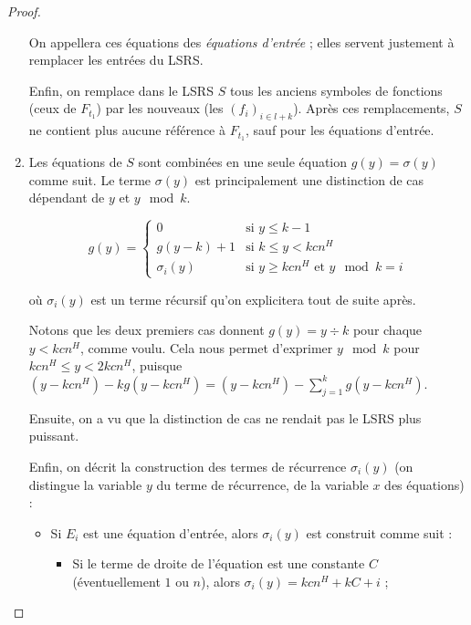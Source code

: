 \documentclass{article}
\begin{document}
\begin{proof}
\begin{enumerate}[itemsep=-1mm,leftmargin=2cm]
					On appellera ces équations des \emph{équations d'entrée} ; elles servent justement à remplacer les entrées du LSRS.
					
					Enfin, on remplace dans le LSRS $S$ tous les anciens symboles de fonctions (ceux de $F_{t_1}$) par les nouveaux (les $(f_i)_{i \in l+k}$). Après ces remplacements, $S$ ne contient plus aucune référence à $F_{t_1}$, sauf pour les équations d'entrée. 
					
				\item 	
					Les équations de $S$ sont combinées en une seule équation $g(y) = \sigma(y)$ comme suit. Le terme $\sigma(y)$ est principalement une distinction de cas dépendant de $y$ et $y \mod{k}$. 
				
					\[
						g(y) = 
							\left\lbrace \begin{array}{ll}
								0 				& \text{si $y \leqslant k-1$} \\
								g(y-k) + 1 		& \text{si $k \leqslant y < kcn^H$} \\
								\sigma_i(y)		& \text{si $y \geqslant kcn^H$ et $y \mod{k} = i$}
							\end{array}\right.
					\]
					
					où $\sigma_i(y)$ est un terme récursif qu'on explicitera tout de suite après. 
					
					Notons que les deux premiers cas donnent $g(y) = y \div k$ pour chaque $y < kcn^H$, comme voulu. Cela nous permet d'exprimer $y \mod{k}$ pour $kcn^H \leqslant y < 2kcn^H$, puisque $(y-kcn^H) - kg(y-kcn^H) = (y-kcn^H) - \sum_{j=1}^{k} g(y-kcn^H)$. 
					
					Ensuite, on a vu que la distinction de cas ne rendait pas le LSRS plus puissant. 
					
					Enfin, on décrit la construction des termes de récurrence $\sigma_i(y)$ (on distingue la variable $y$ du terme de récurrence, de la variable $x$ des équations) :
					
					\begin{itemize}[itemsep=-1mm, leftmargin=1cm]
						\item
							Si $E_i$ est une équation d'entrée, alors $\sigma_i(y)$ est construit comme suit :
					
							\begin{itemize}[itemsep=-1mm,leftmargin=1cm]
								\item %
								Si le terme de droite de l'équation est une constante $C$ (éventuellement $1$ ou $n$), alors $\sigma_i(y) = kcn^H + kC + i$ ;
								

\end{itemize}
\end{itemize}
\end{enumerate}
\end{proof}
\end{document}
